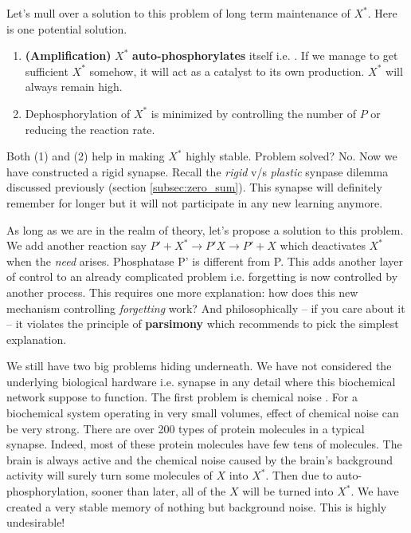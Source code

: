 \documentclass[]{resonance}
\begin{document}
Let's mull over a solution to this problem of long term maintenance of $X^*$.
Here is one potential solution.

\begin{enumerate}
    \item \textbf{(Amplification)} $X^*$ \textbf{auto-phosphorylates} itself i.e. . If we manage to get sufficient $X^*$ somehow, it
        will act as a catalyst to its own production. $X^*$ will always remain
        high.
    \item Dephosphorylation of $X^*$ is minimized by controlling the number of
        $P$ or reducing the reaction rate.
\end{enumerate} 

Both (1) and (2) help in making $X^*$ highly stable. Problem solved? No.  Now
we have constructed a rigid synapse. Recall the \textit{rigid} v/s
\textit{plastic} synpase dilemma discussed previously (section
\ref{subsec:zero_sum}). This synapse will definitely remember for longer
but it will not participate in any new learning anymore.

As long as we are in the realm of theory, let's propose a solution to this
problem. We add another reaction say $P'+X^*\rightarrow P'X \rightarrow P'+X$
which deactivates $X^*$ when the \textit{need} arises. Phosphatase P' is
different from P. This adds another layer of control to an already complicated
problem i.e.  forgetting is now controlled by another process. This requires one
more explanation: how does this new mechanism controlling \textit{forgetting}
work?  And philosophically -- if you care about it -- it violates the principle
of \textbf{parsimony} which recommends to pick the simplest explanation.

We still have two big problems hiding underneath. We have not considered the
underlying biological hardware i.e. synapse in any detail where this biochemical
network suppose to function. The first problem is chemical noise . For a
biochemical system operating in very small volumes, effect of chemical noise can
be very strong.  There are over 200 types of protein molecules in
a typical synapse. Indeed, most of these protein molecules have few tens of
molecules.  The brain is always active and the chemical noise caused by the
brain's background activity will surely turn some molecules of $X$ into $X^*$.
Then due to auto-phosphorylation, sooner than later, all of the $X$ will be
turned into $X^*$. We have created a very stable memory of nothing but
background noise. This is highly undesirable!
\end{document}
